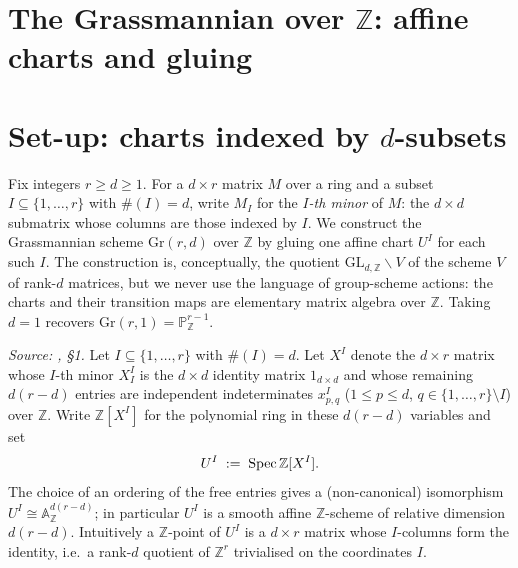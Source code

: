 \section{The Grassmannian over $\mathbb{Z}$: affine charts and gluing}
\label{mk-chap:Picard_GrassmannianCells}

\section{Set-up: charts indexed by $d$-subsets}
\label{mk-sec:gr_setup}

Fix integers \(r \ge d \ge 1\). For a \(d \times r\) matrix \(M\) over a ring
and a subset \(I \subseteq \{1, \dots, r\}\) with \(\#(I) = d\), write \(M_I\)
for the \emph{\(I\)-th minor} of \(M\): the \(d \times d\) submatrix whose
columns are those indexed by \(I\). We construct the Grassmannian scheme
\(\mathrm{Gr}(r,d)\) over \(\mathbb{Z}\) by gluing one affine chart \(U^I\) for
each such \(I\). The construction is, conceptually, the quotient
\(\mathrm{GL}_{d,\mathbb{Z}} \backslash V\) of the scheme \(V\) of rank-\(d\)
matrices, but we never use the language of group-scheme actions: the charts and
their transition maps are elementary matrix algebra over \(\mathbb{Z}\). Taking
\(d = 1\) recovers \(\mathrm{Gr}(r,1) = \mathbb{P}^{r-1}_{\mathbb{Z}}\).

\begin{definition}\label{mk-def:gr_affine_chart}
  \leanok

  \textit{Source: \cite{nitsure-hilbert-quot}, \S 1.}
  Let \(I \subseteq \{1, \dots, r\}\) with \(\#(I) = d\). Let \(X^I\) denote the
  \(d \times r\) matrix whose \(I\)-th minor \(X^I_I\) is the \(d \times d\)
  identity matrix \(1_{d \times d}\) and whose remaining \(d(r - d)\) entries are
  independent indeterminates \(x^I_{p,q}\) (\(1 \le p \le d\),
  \(q \in \{1,\dots,r\} \setminus I\)) over \(\mathbb{Z}\). Write
  \(\mathbb{Z}[X^I]\) for the polynomial ring in these \(d(r-d)\) variables and
  set
  \[
    U^I \;:=\; \operatorname{Spec} \mathbb{Z}[X^I].
  \]
  The choice of an ordering of the free entries gives a (non-canonical)
  isomorphism \(U^I \cong \mathbb{A}^{d(r-d)}_{\mathbb{Z}}\); in particular
  \(U^I\) is a smooth affine \(\mathbb{Z}\)-scheme of relative dimension
  \(d(r-d)\). Intuitively a \(\mathbb{Z}\)-point of \(U^I\) is a \(d \times r\)
  matrix whose \(I\)-columns form the identity, i.e.\ a rank-\(d\) quotient of
  \(\mathbb{Z}^{r}\) trivialised on the coordinates \(I\).
\end{definition}


